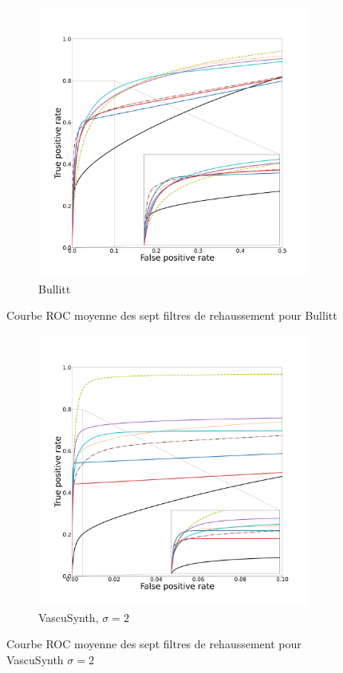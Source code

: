 \begin{figure}[!ht]
  \begin{subfigure}[t]{\textwidth}
    \centering
  \includegraphics[clip = true, trim  =  125 125 180 200, height=9cm]{Images/Bullitt_ROC.pdf}
  \caption{Bullitt}
  \end{subfigure}
  \caption{Courbe ROC moyenne des sept filtres de rehaussement pour Bullitt}
\end{figure}
\begin{figure}[!ht]
  \begin{subfigure}[t]{\textwidth}
    \centering
  \includegraphics[clip = true, trim  =  125 125 100 200, height=9cm]{Images/Vascu_2_ROC.pdf}
  \caption{VascuSynth, $\sigma = 2$}
\end{subfigure}
\caption{Courbe ROC moyenne des sept filtres de rehaussement pour VascuSynth $\sigma=2$}
\end{figure}

